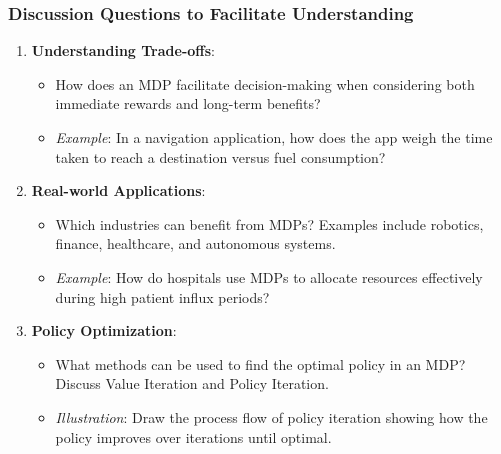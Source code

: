 \documentclass[aspectratio=169]{beamer}
\begin{document}
\begin{frame}[fragile]
    \frametitle{Discussion Questions to Facilitate Understanding}
    \begin{enumerate}
        \item \textbf{Understanding Trade-offs}: 
        \begin{itemize}
            \item How does an MDP facilitate decision-making when considering both immediate rewards and long-term benefits?
            \item \textit{Example}: In a navigation application, how does the app weigh the time taken to reach a destination versus fuel consumption?
        \end{itemize}
        
        \item \textbf{Real-world Applications}: 
        \begin{itemize}
            \item Which industries can benefit from MDPs? Examples include robotics, finance, healthcare, and autonomous systems.
            \item \textit{Example}: How do hospitals use MDPs to allocate resources effectively during high patient influx periods?
        \end{itemize}

        \item \textbf{Policy Optimization}: 
        \begin{itemize}
            \item What methods can be used to find the optimal policy in an MDP? Discuss Value Iteration and Policy Iteration.
            \item \textit{Illustration}: Draw the process flow of policy iteration showing how the policy improves over iterations until optimal.
        \end{itemize}
    \end{enumerate}
\end{frame}
\end{document}
